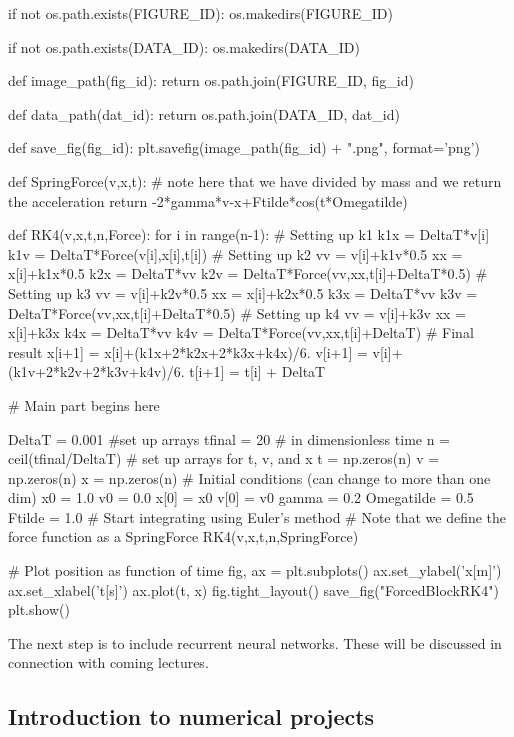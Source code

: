 \documentclass[%
oneside,                 %
final,                   %
10pt]{article}
\begin{document}
if not os.path.exists(FIGURE_ID):
    os.makedirs(FIGURE_ID)

if not os.path.exists(DATA_ID):
    os.makedirs(DATA_ID)

def image_path(fig_id):
    return os.path.join(FIGURE_ID, fig_id)

def data_path(dat_id):
    return os.path.join(DATA_ID, dat_id)

def save_fig(fig_id):
    plt.savefig(image_path(fig_id) + ".png", format='png')


def SpringForce(v,x,t):
#   note here that we have divided by mass and we return the acceleration
    return  -2*gamma*v-x+Ftilde*cos(t*Omegatilde)


def RK4(v,x,t,n,Force):
    for i in range(n-1):
# Setting up k1
        k1x = DeltaT*v[i]
        k1v = DeltaT*Force(v[i],x[i],t[i])
# Setting up k2
        vv = v[i]+k1v*0.5
        xx = x[i]+k1x*0.5
        k2x = DeltaT*vv
        k2v = DeltaT*Force(vv,xx,t[i]+DeltaT*0.5)
# Setting up k3
        vv = v[i]+k2v*0.5
        xx = x[i]+k2x*0.5
        k3x = DeltaT*vv
        k3v = DeltaT*Force(vv,xx,t[i]+DeltaT*0.5)
# Setting up k4
        vv = v[i]+k3v
        xx = x[i]+k3x
        k4x = DeltaT*vv
        k4v = DeltaT*Force(vv,xx,t[i]+DeltaT)
# Final result
        x[i+1] = x[i]+(k1x+2*k2x+2*k3x+k4x)/6.
        v[i+1] = v[i]+(k1v+2*k2v+2*k3v+k4v)/6.
        t[i+1] = t[i] + DeltaT


# Main part begins here

DeltaT = 0.001
#set up arrays 
tfinal = 20 # in dimensionless time
n = ceil(tfinal/DeltaT)
# set up arrays for t, v, and x
t = np.zeros(n)
v = np.zeros(n)
x = np.zeros(n)
# Initial conditions (can change to more than one dim)
x0 =  1.0 
v0 = 0.0
x[0] = x0
v[0] = v0
gamma = 0.2
Omegatilde = 0.5
Ftilde = 1.0
# Start integrating using Euler's method
# Note that we define the force function as a SpringForce
RK4(v,x,t,n,SpringForce)

# Plot position as function of time    
fig, ax = plt.subplots()
ax.set_ylabel('x[m]')
ax.set_xlabel('t[s]')
ax.plot(t, x)
fig.tight_layout()
save_fig("ForcedBlockRK4")
plt.show()


\epycod


The next step is to include recurrent neural networks. These will be discussed in connection with coming lectures.

\subsection{Introduction to numerical projects}
\end{document}
